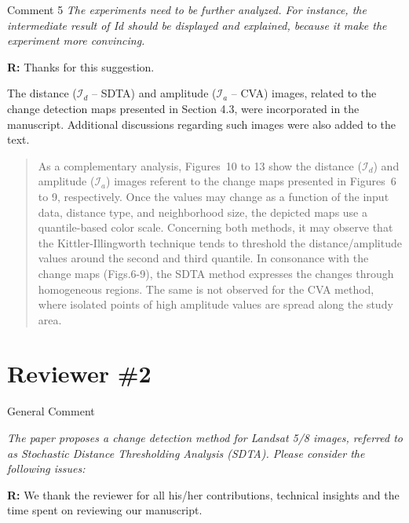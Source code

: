 \documentclass[11pt]{report}
\begin{document}
\medskip
\begin{mybox}{Comment 5}
\textit{The experiments need to be further analyzed. For instance, the intermediate result of Id should be displayed and explained, because it make the experiment more convincing.}


\medskip
\textbf{R:} Thanks for this suggestion.

The distance ($\mathcal{I}_{d}$ -- SDTA) and amplitude ($\mathcal{I}_{a}$ -- CVA) images, related to the change detection maps presented in Section 4.3, were incorporated in the manuscript. Additional discussions regarding such images were also added to the text.


\medskip

\begin{quotation}

As a complementary analysis, Figures~10 to 13 show the distance ($\mathcal{I}_d$) and amplitude ($\mathcal{I}_a$) images referent to the change maps presented in Figures~6 to 9, respectively. Once the values may change as a function of the input data, distance type, and neighborhood size, the depicted maps use a quantile-based color scale.
%
Concerning both methods, it may observe that the Kittler-Illingworth technique tends to threshold the distance/amplitude values around the second and third quantile.
%
In consonance with the change maps (Figs.6-9), the SDTA method expresses the changes through homogeneous regions. The same is not observed for the CVA method, where isolated points of high amplitude values are spread along the study area.


\end{quotation}



\end{mybox}

\vspace{0.3cm}



\newpage



\vspace{0.25cm}

\section*{Reviewer \#2}


\begin{mybox}{General Comment}

\textit{The paper proposes a change detection method for Landsat 5/8 images, referred to as Stochastic Distance Thresholding Analysis (SDTA). Please consider the following issues:}

\medskip

\textbf{R:}  We thank the reviewer for all his/her contributions, technical insights and the time spent on reviewing our manuscript.
\end{mybox}
\end{document}
